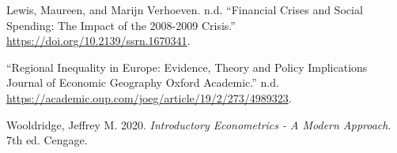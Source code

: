 \documentclass[
  a4paper,
  DIV=11,
  numbers=noendperiod]{scrartcl}
\newlength{\cslhangindent}
\newlength{\cslentryspacingunit} %
\newenvironment{CSLReferences}[2] %
 {%
  \setlength{\parindent}{0pt}
  \ifodd #1
  \let\oldpar\par
  \def\par{\hangindent=\cslhangindent\oldpar}
  \fi
  \setlength{\parskip}{#2\cslentryspacingunit}
 }%
 {}
\begin{document}
\begin{CSLReferences}{1}{0}
\leavevmode{}%
Lewis, Maureen, and Marijn Verhoeven. n.d. {``Financial Crises and
Social Spending: The Impact of the 2008-2009 Crisis.''}
\url{https://doi.org/10.2139/ssrn.1670341}.

\leavevmode{}%
{``Regional Inequality in Europe: Evidence, Theory and Policy
Implications \textbar{} Journal of Economic Geography \textbar{} Oxford
Academic.''} n.d.
\url{https://academic.oup.com/joeg/article/19/2/273/4989323}.

\leavevmode{}%
Wooldridge, Jeffrey M. 2020. \emph{Introductory {Econometrics} - {A
Modern Approach}}. 7th ed. {Cengage}.

\end{CSLReferences}
\end{document}

